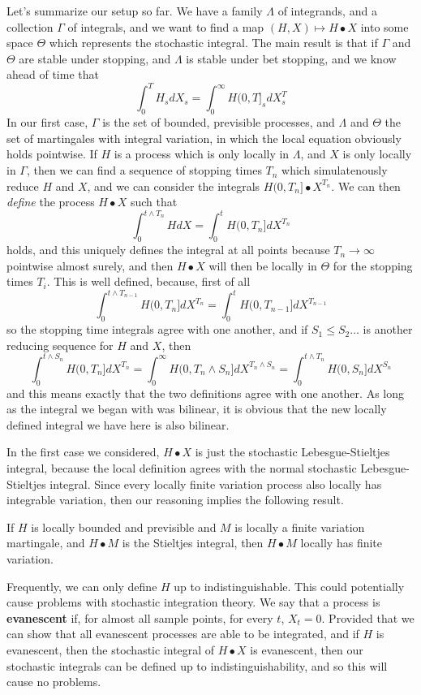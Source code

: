 Let's summarize our setup so far. We have a family $\Lambda$ of integrands, and a collection $\Gamma$ of integrals, and we want to find a map $(H,X) \mapsto H \bullet X$ into some space $\Theta$ which represents the stochastic integral. The main result is that if $\Gamma$ and $\Theta$ are stable under stopping, and $\Lambda$ is stable under bet stopping, and we know ahead of time that
%
\[ \int_0^T H_s dX_s = \int_0^\infty H(0,T]_s dX^T_s \]
%
In our first case, $\Gamma$ is the set of bounded, previsible processes, and $\Lambda$ and $\Theta$ the set of martingales with integral variation, in which the local equation obviously holds pointwise. If $H$ is a process which is only locally in $\Lambda$, and $X$ is only locally in $\Gamma$, then we can find a sequence of stopping times $T_n$ which simulatenously reduce $H$ and $X$, and we can consider the integrals $H(0,T_n] \bullet X^{T_n}$. We can then {\it define} the process $H \bullet X$ such that
%
\[ \int_0^{t \wedge T_n} H dX = \int_0^t H(0,T_n] dX^{T_n} \]
%
holds, and this uniquely defines the integral at all points because $T_n \to \infty$ pointwise almost surely, and then $H \bullet X$ will then be locally in $\Theta$ for the stopping times $T_i$. This is well defined, because, first of all
%
\[ \int_0^{t \wedge T_{n-1}} H(0,T_n] dX^{T_n} = \int_0^t H(0,T_{n-1}] dX^{T_{n-1}} \]
%
so the stopping time integrals agree with one another, and if $S_1 \leq S_2 \dots$ is another reducing sequence for $H$ and $X$, then
%
\[ \int_0^{t \wedge S_n} H(0,T_n] dX^{T_n} = \int_0^\infty H(0,T_n \wedge S_n] dX^{T_n \wedge S_n} = \int_0^{t \wedge T_n} H(0,S_n] dX^{S_n} \]
%
and this means exactly that the two definitions agree with one another. As long as the integral we began with was bilinear, it is obvious that the new locally defined integral we have here is also bilinear.

In the first case we considered, $H \bullet X$ is just the stochastic Lebesgue-Stieltjes integral, because the local definition agrees with the normal stochastic Lebesgue-Stieltjes integral. Since every locally finite variation process also locally has integrable variation, then our reasoning implies the following result.

\begin{theorem}
    If $H$ is locally bounded and previsible and $M$ is locally a finite variation martingale, and $H \bullet M$ is the Stieltjes integral, then $H \bullet M$ locally has finite variation.
\end{theorem}

Frequently, we can only define $H$ up to indistinguishable. This could potentially cause problems with stochastic integration theory. We say that a process is {\bf evanescent} if, for almost all sample points, for every $t$, $X_t = 0$. Provided that we can show that all evanescent processes are able to be integrated, and if $H$ is evanescent, then the stochastic integral of $H \bullet X$ is evanescent, then our stochastic integrals can be defined up to indistinguishability, and so this will cause no problems.

